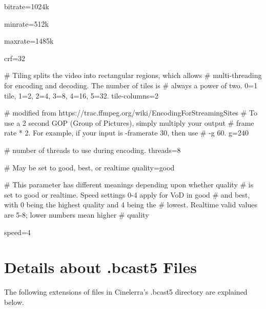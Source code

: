 bitrate=1024k

minrate=512k

maxrate=1485k

crf=32
\medskip

\# Tiling splits the video into rectangular regions, which allows
\# multi-threading for encoding and decoding. The number of tiles is
\# always a power of two. 0=1 tile, 1=2, 2=4, 3=8, 4=16, 5=32.
tile-columns=2
\medskip

\# modified from https://trac.ffmpeg.org/wiki/EncodingForStreamingSites
\# To use a 2 second GOP (Group of Pictures), simply multiply your output
\# frame rate * 2. For example, if your input is -framerate 30, then use
\# -g 60.
g=240
\medskip

\# number of threads to use during encoding.
threads=8
\medskip

\# May be set to good, best, or realtime
quality=good
\medskip

\# This parameter has different meanings depending upon whether quality
\# is set to good or realtime. Speed settings 0-4 apply for VoD in good
\# and best, with 0 being the highest quality and 4 being the
\# lowest. Realtime valid values are 5-8; lower numbers mean higher
\# quality
\medskip

speed=4

\section{Details about .bcast5 Files}
\label{sec:Details about .bcast5 Files}
\medskip

The following extensions of files in Cinelerra's .bcast5 directory are explained below.

